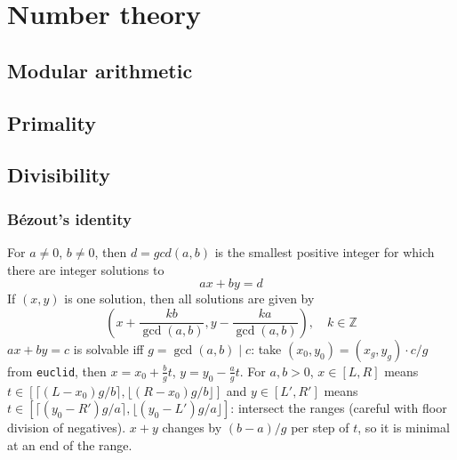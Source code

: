 \chapter{Number theory}

\section{Modular arithmetic}

\section{Primality}

\section{Divisibility}

	\subsection{Bézout's identity}
	For $a \neq 0$, $b \neq 0$, then $d=gcd(a,b)$ is the smallest positive integer for which there are integer solutions to
	$$ax+by=d$$
	If $(x,y)$ is one solution, then all solutions are given by
	$$\left(x+\frac{kb}{\gcd(a,b)}, y-\frac{ka}{\gcd(a,b)}\right), \quad k\in\mathbb{Z}$$
	$ax+by=c$ is solvable iff $g=\gcd(a,b) \mid c$: take $(x_0,y_0) = (x_g, y_g) \cdot c/g$ from \texttt{euclid}, then $x = x_0 + \frac bg t$, $y = y_0 - \frac ag t$.
	For $a, b > 0$, $x \in [L, R]$ means $t \in [\lceil (L-x_0)g/b \rceil, \lfloor (R-x_0)g/b \rfloor]$ and $y \in [L', R']$ means $t \in [\lceil (y_0-R')g/a \rceil, \lfloor (y_0-L')g/a \rfloor]$:
	intersect the ranges (careful with floor division of negatives). $x + y$ changes by $(b-a)/g$ per step of $t$, so it is minimal at an end of the range.


